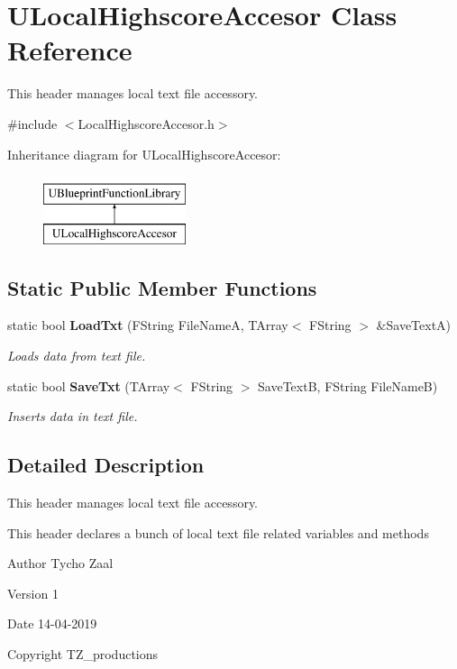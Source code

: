 \section{U\+Local\+Highscore\+Accesor Class Reference}
\label{class_u_local_highscore_accesor}


This header manages local text file accessory.  




{\ttfamily \#include $<$Local\+Highscore\+Accesor.\+h$>$}

Inheritance diagram for U\+Local\+Highscore\+Accesor\+:\begin{figure}[H]
\begin{center}
\leavevmode
\includegraphics[height=2.000000cm]{class_u_local_highscore_accesor}
\end{center}
\end{figure}
\subsection*{Static Public Member Functions}
\begin{DoxyCompactItemize}
\item 
static bool \textbf{ Load\+Txt} (F\+String File\+NameA, T\+Array$<$ F\+String $>$ \&Save\+TextA)
\begin{DoxyCompactList}\small\item\em Loads data from text file. \end{DoxyCompactList}\item 
static bool \textbf{ Save\+Txt} (T\+Array$<$ F\+String $>$ Save\+TextB, F\+String File\+NameB)
\begin{DoxyCompactList}\small\item\em Inserts data in text file. \end{DoxyCompactList}\end{DoxyCompactItemize}


\subsection{Detailed Description}
This header manages local text file accessory. 

This header declares a bunch of local text file related variables and methods \begin{DoxyAuthor}{Author}
Tycho Zaal 
\end{DoxyAuthor}
\begin{DoxyVersion}{Version}
1 
\end{DoxyVersion}
\begin{DoxyDate}{Date}
14-\/04-\/2019 
\end{DoxyDate}
\begin{DoxyCopyright}{Copyright}
T\+Z\+\_\+productions 
\end{DoxyCopyright}


